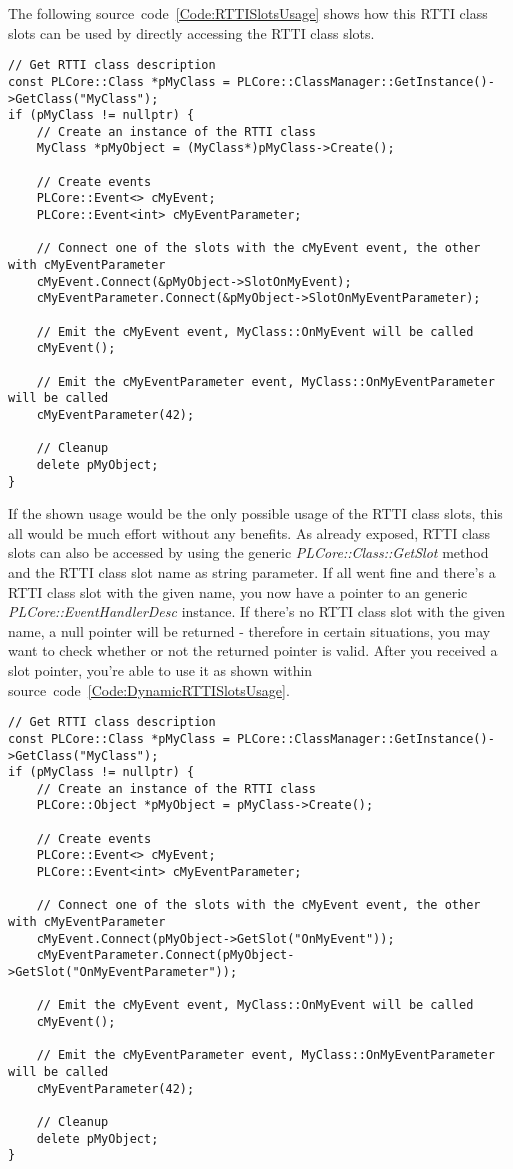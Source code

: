 The following source~code~\ref{Code:RTTISlotsUsage} shows how this RTTI class slots can be used by directly accessing the RTTI class slots.
\begin{lstlisting}[label=Code:RTTISlotsUsage,caption={RTTI class slots usage}]
// Get RTTI class description
const PLCore::Class *pMyClass = PLCore::ClassManager::GetInstance()->GetClass("MyClass");
if (pMyClass != nullptr) {
	// Create an instance of the RTTI class
	MyClass *pMyObject = (MyClass*)pMyClass->Create();

	// Create events
	PLCore::Event<> cMyEvent;
	PLCore::Event<int> cMyEventParameter;

	// Connect one of the slots with the cMyEvent event, the other with cMyEventParameter
	cMyEvent.Connect(&pMyObject->SlotOnMyEvent);
	cMyEventParameter.Connect(&pMyObject->SlotOnMyEventParameter);

	// Emit the cMyEvent event, MyClass::OnMyEvent will be called
	cMyEvent();

	// Emit the cMyEventParameter event, MyClass::OnMyEventParameter will be called
	cMyEventParameter(42);

	// Cleanup
	delete pMyObject;
}
\end{lstlisting}
If the shown usage would be the only possible usage of the RTTI class slots, this all would be much effort without any benefits. As already exposed, RTTI class slots can also be accessed by using the generic \emph{PLCore::Class::GetSlot} method and the RTTI class slot name as string parameter. If all went fine and there's a RTTI class slot with the given name, you now have a pointer to an generic \emph{PLCore::EventHandlerDesc} instance. If there's no RTTI class slot with the given name, a null pointer will be returned - therefore in certain situations, you may want to check whether or not the returned pointer is valid. After you received a slot pointer, you're able to use it as shown within source~code~\ref{Code:DynamicRTTISlotsUsage}.
\begin{lstlisting}[label=Code:DynamicRTTISlotsUsage,caption={Dynamic RTTI class slots usage}]
// Get RTTI class description
const PLCore::Class *pMyClass = PLCore::ClassManager::GetInstance()->GetClass("MyClass");
if (pMyClass != nullptr) {
	// Create an instance of the RTTI class
	PLCore::Object *pMyObject = pMyClass->Create();

	// Create events
	PLCore::Event<> cMyEvent;
	PLCore::Event<int> cMyEventParameter;

	// Connect one of the slots with the cMyEvent event, the other with cMyEventParameter
	cMyEvent.Connect(pMyObject->GetSlot("OnMyEvent"));
	cMyEventParameter.Connect(pMyObject->GetSlot("OnMyEventParameter"));

	// Emit the cMyEvent event, MyClass::OnMyEvent will be called
	cMyEvent();

	// Emit the cMyEventParameter event, MyClass::OnMyEventParameter will be called
	cMyEventParameter(42);

	// Cleanup
	delete pMyObject;
}
\end{lstlisting}
